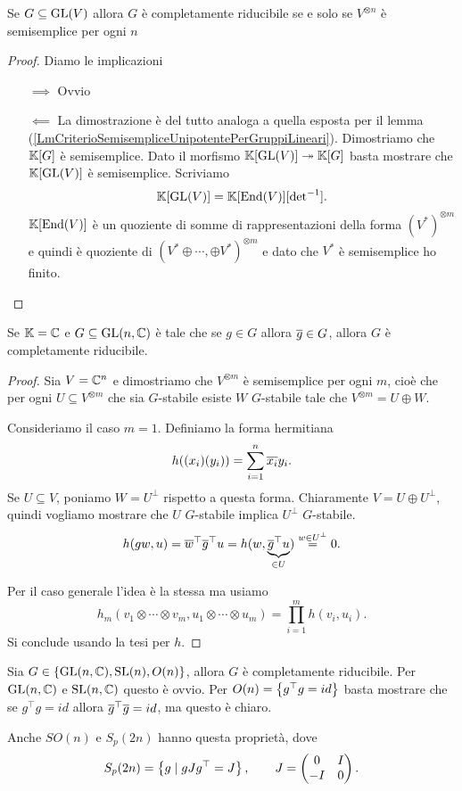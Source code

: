 \begin{lemma}
    Se $G\subseteq \GL(V)$ allora $G$ \`e completamente riducibile se e solo se $V^{\otimes n}$ \`e semisemplice per ogni $n$
\end{lemma}
\begin{proof}
Diamo le implicazioni
\setlength{\leftmargini}{0cm}
\begin{itemize}
\item[$\boxed{\implies}$] Ovvio
\item[$\boxed{\impliedby}$] La dimostrazione \`e del tutto analoga a quella esposta per il lemma (\ref{LmCriterioSemisempliceUnipotentePerGruppiLineari}). Dimostriamo che $\K[G]$ \`e semisemplice. Dato il morfismo
$\K[\GL(V)]\onto \K[G]$
basta mostrare che $\K[\GL(V)]$ \`e semisemplice. Scriviamo \[\K[\GL(V)]=\K[\End(V)][{\det}\ii].\]
$\K[\End(V)]$ \`e un quoziente di somme di rappresentazioni della forma $(V^\ast)^{\otimes m}$ e quindi \`e quoziente di $(V^\ast\oplus\cdots, \oplus V^\ast)^{\otimes m}$ e dato che $V^\ast$ \`e semisemplice ho finito.
\end{itemize}
\setlength{\leftmargini}{0.5cm}
\end{proof}

\begin{corollary}
    Se $\K=\C$ e $G\subseteq \GL(n,\C)$ \`e tale che se $g\in G$ allora $\ol g\in G$, allora $G$ \`e completamente riducibile.
\end{corollary}
\begin{proof}
Sia $V=\C^n$ e dimostriamo che $V^{\otimes m}$ \`e semisemplice per ogni $m$, cio\`e che per ogni $U\subseteq V^{\otimes m}$ che sia $G$-stabile esiste $W$ $G$-stabile tale che $V^{\otimes m}=U\oplus W$.

Consideriamo il caso $m=1$. Definiamo la forma hermitiana
\[h((x_i)(y_i))=\sum_{i=1}^n \ol{x_i}y_i.\]
Se $U\subseteq V$, poniamo $W=U^\perp$ rispetto a questa forma. Chiaramente $V=U\oplus U^\perp$, quindi vogliamo mostrare che $U$ $G$-stabile implica $U^\perp$ $G$-stabile.
\[h(gw,u)=\ol w^\top \ol g^\top u=h(w,\under{\in U}{\ol g^\top u})\pasgnlmath={w\in U^\perp}0.\]


Per il caso generale l'idea \`e la stessa ma usiamo
\[h_m(v_1\otimes\cdots\otimes v_m,u_1\otimes \cdots\otimes u_m)=\prod_{i=1}^m h(v_i,u_i).\]
Si conclude usando la tesi per $h$.
\end{proof}

\begin{example}
Sia $G\in\cpa{\GL(n,\C), \SL(n), O(n)}$, allora $G$ \`e completamente riducibile. Per $\GL(n,\C)$ e $\SL(n,\C)$ questo \`e ovvio. Per $O(n)=\cpa{g^\top g=id}$ basta mostrare che se $g^\top g=id$ allora $\ol g^\top \ol g=id$, ma questo \`e chiaro.


Anche $SO(n)$ e $S_p(2n)$ hanno questa propriet\`a, dove
\[S_p(2n)=\cpa{g\mid gJg^\top=J},\qquad J=\mat{0 &I\\ -I &0}.\]
\end{example}



